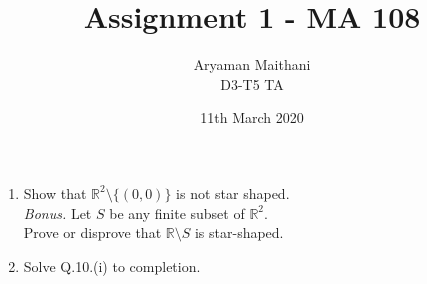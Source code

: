 \documentclass[a6paper, landscape]{article}
\title{Assignment 1 - MA 108}				%
\author{Aryaman Maithani
\\\small D3-T5 TA}
\date{11th March 2020}		%
\begin{document}
\maketitle

\begin{enumerate}[label = Q.\arabic*.] 
	\item Show that $\mathbb{R}^2\setminus\{(0, 0)\}$ is not star shaped.\\
	\emph{Bonus.} Let $S$ be any finite subset of $\mathbb{R}^2.$ \\
	Prove or disprove that $\mathbb{R}\setminus S$ is star-shaped.
	\item Solve Q.10.(i) to completion.
\end{enumerate}
\end{document}
